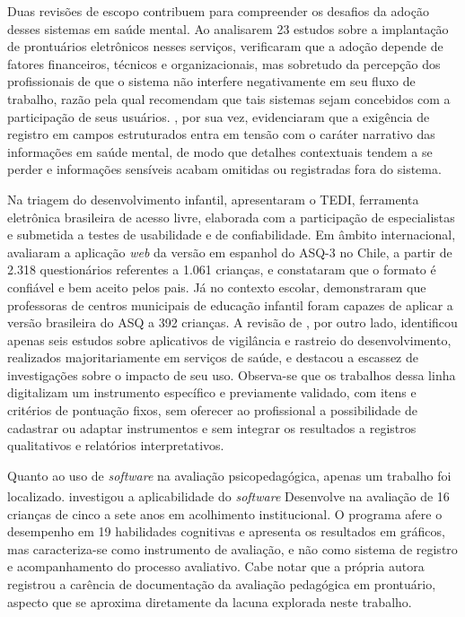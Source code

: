 Duas revisões de escopo contribuem para compreender os desafios da adoção desses sistemas em saúde mental. Ao analisarem 23 estudos sobre a implantação de prontuários eletrônicos nesses serviços,  verificaram que a adoção depende de fatores financeiros, técnicos e organizacionais, mas sobretudo da percepção dos profissionais de que o sistema não interfere negativamente em seu fluxo de trabalho, razão pela qual recomendam que tais sistemas sejam concebidos com a participação de seus usuários. , por sua vez, evidenciaram que a exigência de registro em campos estruturados entra em tensão com o caráter narrativo das informações em saúde mental, de modo que detalhes contextuais tendem a se perder e informações sensíveis acabam omitidas ou registradas fora do sistema.

Na triagem do desenvolvimento infantil,  apresentaram o TEDI, ferramenta eletrônica brasileira de acesso livre, elaborada com a participação de especialistas e submetida a testes de usabilidade e de confiabilidade. Em âmbito internacional,  avaliaram a aplicação \textit{web} da versão em espanhol do ASQ-3 no Chile, a partir de 2.318 questionários referentes a 1.061 crianças, e constataram que o formato é confiável e bem aceito pelos pais. Já no contexto escolar,  demonstraram que professoras de centros municipais de educação infantil foram capazes de aplicar a versão brasileira do ASQ a 392 crianças. A revisão de , por outro lado, identificou apenas seis estudos sobre aplicativos de vigilância e rastreio do desenvolvimento, realizados majoritariamente em serviços de saúde, e destacou a escassez de investigações sobre o impacto de seu uso. Observa-se que os trabalhos dessa linha digitalizam um instrumento específico e previamente validado, com itens e critérios de pontuação fixos, sem oferecer ao profissional a possibilidade de cadastrar ou adaptar instrumentos e sem integrar os resultados a registros qualitativos e relatórios interpretativos.

Quanto ao uso de \textit{software} na avaliação psicopedagógica, apenas um trabalho foi localizado.  investigou a aplicabilidade do \textit{software} Desenvolve\textsuperscript{\textregistered} na avaliação de 16 crianças de cinco a sete anos em acolhimento institucional. O programa afere o desempenho em 19 habilidades cognitivas e apresenta os resultados em gráficos, mas caracteriza-se como instrumento de avaliação, e não como sistema de registro e acompanhamento do processo avaliativo. Cabe notar que a própria autora registrou a carência de documentação da avaliação pedagógica em prontuário, aspecto que se aproxima diretamente da lacuna explorada neste trabalho.

